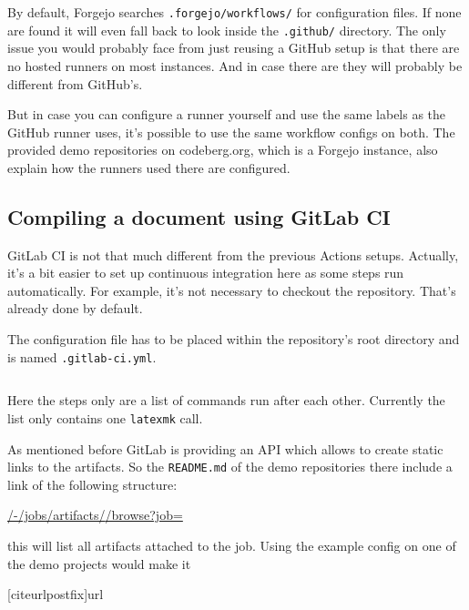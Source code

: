 \documentclass[final]{ltugboat}
\newcommand*{\setListingIcon}[1]{\def\listingIcon{#1}}
\newcommand*{\command}[1]{\texttt{#1}}
\newcommand*{\file}[1]{\texttt{#1}}
\newcommand*{\directory}[1]{\texttt{#1}}
\begin{document}
By default, Forgejo searches \directory{.forgejo/workflows/} for configuration files.
If none are found it will even fall back to look inside the \directory{.github/} directory.
The only issue you would probably face from just reusing a GitHub setup is that there are no hosted runners on most instances.
And in case there are they will probably be different from GitHub's.

But in case you can configure a runner yourself and use the same labels as the GitHub runner \cite[described in]{forgejo-runner-config} uses, it's possible to use the same workflow configs on both.
The provided demo repositories on codeberg.org, which is a Forgejo instance, also explain how the runners used there are configured.

\subsection{Compiling a document using GitLab CI}
\setListingIcon{\GitLab}

GitLab CI is not that much different from the previous Actions setups.
Actually, it's a bit easier to set up continuous integration here as some steps run automatically.
For example, it's not necessary to checkout the repository.
That's already done by default.

The configuration file has to be placed within the repository's root directory and is named \file{.gitlab-ci.yml}.

\inputminted[breaklines,breakafter=/]{yaml}{examples/latex-basic-gitlab.yml}

Here the steps only are a list of commands run after each other. Currently the list only contains one \command{latexmk} call.

As mentioned before GitLab is providing an API which allows to create static links to the artifacts.
So the \file{README.md} of the demo repositories there include a link of the following structure:

\begin{FlushLeft}
\url{/-/jobs/artifacts/}\allowbreak\url{/browse?job=}
\end{FlushLeft}

this will list all artifacts attached to the job.
Using the example config on one of the demo projects would make it

\begin{FlushLeft}
{[citeurlpostfix]{url}}
\end{FlushLeft}
\end{document}
